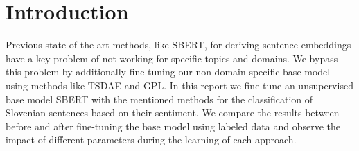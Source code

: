 \documentclass[fleqn,moreauthors,10pt]{ds_report}
\affiliation{\textit{Advisors: Slavko Žitnik, Aleš Žagar, Boshko Koloski}}
\begin{document}
\flushbottom 

\maketitle 

\thispagestyle{empty} 


\section*{Introduction}

Previous state-of-the-art methods, like SBERT, for deriving sentence embeddings have a key problem of not working for specific topics and domains. We bypass this problem by additionally fine-tuning our non-domain-specific base model using methods like TSDAE and GPL. In this report we fine-tune an unsupervised base model SBERT with the mentioned methods for the classification of Slovenian sentences based on their sentiment. We compare the results between before and after fine-tuning the base model using labeled data and observe the impact of different parameters during the learning of each approach.


\end{document}
